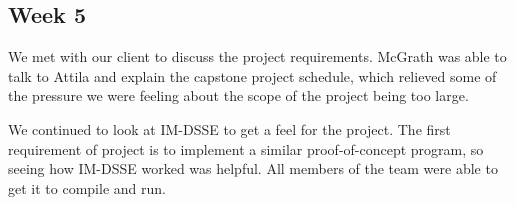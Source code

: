 \documentclass[onecolumn, draftclsnofoot,10pt, compsoc]{IEEEtran}
\begin{document}
\begin{comment}
SR: 
	- Meet with Atilla/Thang
	- Submit Final Problem Statement.
	- Meet with Andrew (TA)
	- Update Problem Statement
	- Look over Thang's implementation of Bit Matrix (get it to work)


AE: We spent the week writing our problem statement and working with our client and McGrath to try and nail down the scope of the project. From the meeting with Attila yesterday, it sounds like he's a little more understanding of the capstone structure, and is okay with downgrading the password manager project to a stretch goal. Our task between now and next week is to take a look at the code that Thang wrote for their previous project—compile and run it to get a feel for what we're expected to build. 
Met with TA for the first time.

SM: 
Class note:
	• Discussed our git repo and using meaningful commit messages for worklog 
	• Final draft of problem statement due Oct. 20th 
		○ Submit to teach
For client to sign off have them email professor to verify
Group meeting: 
	• Worked on finalizing the problem statement
		○ Will meet with Attila to discuss the overall scope of the project
	• Worked on setting up Thang's implementation of IM-DSSE.
		○ Issue with getting the code to compile…. Other source files not found
Need to link source file path to move forward with setting up the implemention
Class Notes:
	• "Stay the hell away!" -Kevin
	• Problem Statement
		○ Set up a one note page for the group to submit assignments rather than using teach
		○ Use metrics that are measurable
		○ Identify the problem 
		○ What is the abstract?
		○ Don’t confuse management and presentation of results with problems and solutions 
	• Requirements Document Due: Oct 27th 
		○ Posted document as a guideline
			§ Look at section 5
		○ Will essentially be the rubric for what we are graded on at the end of the term 
\end{comment}
\subsection{Week 5} %

We met with our client to discuss the project requirements. McGrath was able to talk to Attila and explain the capstone project schedule, which relieved some of the pressure we were feeling about the scope of the project being too large.

We continued to look at IM-DSSE to get a feel for the project. The first requirement of project is to implement a similar proof-of-concept program, so seeing how IM-DSSE worked was helpful. All members of the team were able to get it to compile and run.
\end{document}
